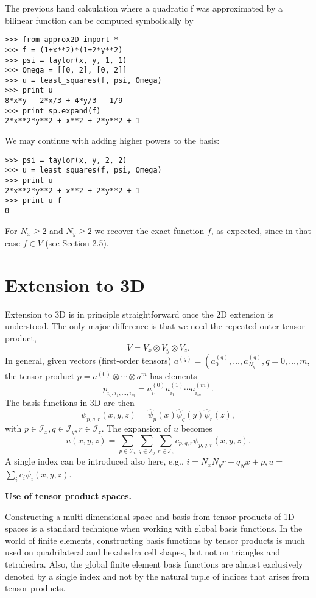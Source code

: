 \documentclass[../main.tex]{subfiles}
\begin{document}
The previous hand calculation where a quadratic f was approximated by a
bilinear function can be computed symbolically by
\begin{lstlisting}[numbers=none]
>>> from approx2D import *
>>> f = (1+x**2)*(1+2*y**2)
>>> psi = taylor(x, y, 1, 1)
>>> Omega = [[0, 2], [0, 2]]
>>> u = least_squares(f, psi, Omega)
>>> print u
8*x*y - 2*x/3 + 4*y/3 - 1/9
>>> print sp.expand(f)
2*x**2*y**2 + x**2 + 2*y**2 + 1	
\end{lstlisting}
We may continue with adding higher powers to the basis:
\begin{lstlisting}[numbers=none]
>>> psi = taylor(x, y, 2, 2)
>>> u = least_squares(f, psi, Omega)
>>> print u
2*x**2*y**2 + x**2 + 2*y**2 + 1
>>> print u-f
0	
\end{lstlisting}
For $N_{x} \geq 2$ and $N_{y} \geq 2$ we recover the exact function $f$, as expected, since in that case $f \in V$ (see Section \hyperref[sec:sec_2_5]{2.5}).
\bigbreak 

\section[Extension to 3D]{Extension to 3D}
\label{sec:sec_8_4}
\noindent Extension to 3D is in principle straightforward once the $2 \mathrm{D}$ extension is understood. The only major difference is that we need the repeated outer tensor product,
$$
V=V_{x} \otimes V_{y} \otimes V_{z}.
$$
In general, given vectors (first-order tensors) $a^{(q)}=\left(a_{0}^{(q)}, \ldots, a_{N_{q}}^{(q)}, q=0, \ldots, m\right.$, the tensor product $p=a^{(0)} \otimes \cdots \otimes a^{m}$ has elements
$$
p_{i_{0}, i_{1}, \ldots, i_{m}}=a_{i_{1}}^{(0)} a_{i_{1}}^{(1)} \cdots a_{i_{m}}^{(m)} .
$$
The basis functions in $3 \mathrm{D}$ are then
$$
\psi_{p, q, r}(x, y, z)=\hat{\psi}_{p}(x) \hat{\psi}_{q}(y) \hat{\psi}_{r}(z),
$$
with $p \in \mathcal{I}_{x}, q \in \mathcal{I}_{y}, r \in \mathcal{I}_{z}$. The expansion of $u$ becomes
$$
u(x, y, z)=\sum_{p \in \mathcal{I}_{x}} \sum_{q \in \mathcal{I}_{y}} \sum_{r \in \mathcal{I}_{z}} c_{p, q, r} \psi_{p, q, r}(x, y, z) .
$$
A single index can be introduced also here, e.g., $i=N_{x} N_{y} r+q_{N} x+p, u=$ $\sum_{i} c_{i} \psi_{i}(x, y, z)$.
\begin{mybox}
	\textbf{Use of tensor product spaces.}
	
	\noindent Constructing a multi-dimensional space and basis from tensor products of 1D spaces is a standard technique when working with global basis functions. In the world of finite elements, constructing basis functions by tensor products is much used on quadrilateral and hexahedra cell shapes, but not on triangles and tetrahedra. Also, the global finite element basis functions are almost exclusively denoted by a single index and not by the natural tuple of indices that arises from tensor products.
\end{mybox}
\end{document}
